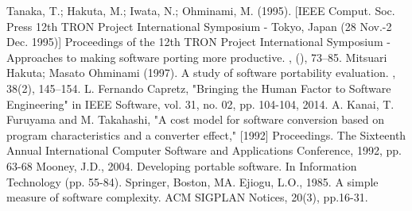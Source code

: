 \documentclass[conference]{IEEEtran}
\begin{document}
\begin{thebibliography}{00}
 Tanaka, T.; Hakuta, M.; Iwata, N.; Ohminami, M. (1995). [IEEE Comput. Soc. Press 12th TRON Project International Symposium - Tokyo, Japan (28 Nov.-2 Dec. 1995)] Proceedings of the 12th TRON Project International Symposium - Approaches to making software porting more productive. , (), 73–85.
 Mitsuari Hakuta; Masato Ohminami (1997). A study of software portability evaluation. , 38(2), 145–154.
 L. Fernando Capretz, "Bringing the Human Factor to Software Engineering" in IEEE Software, vol. 31, no. 02, pp. 104-104, 2014.
 A. Kanai, T. Furuyama and M. Takahashi, "A cost model for software conversion based on program characteristics and a converter effect," [1992] Proceedings. The Sixteenth Annual International Computer Software and Applications Conference, 1992, pp. 63-68
 Mooney, J.D., 2004. Developing portable software. In Information Technology (pp. 55-84). Springer, Boston, MA.
 Ejiogu, L.O., 1985. A simple measure of software complexity. ACM SIGPLAN Notices, 20(3), pp.16-31.
\end{thebibliography}
\end{document}
